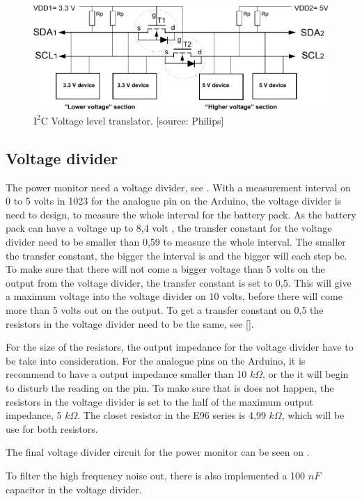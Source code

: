 \begin{figure}[H]
	\centering
	\includegraphics[scale=0.9]{figures/i2cLevel.pdf}
	\caption{$\text{I}^2\text{C}$ Voltage level translator. [source: Philips]}
	\label{i2clevel}
\end{figure}

\subsection{Voltage divider}

The power monitor need a voltage divider, see . With a measurement interval on 0 to 5 volts in 1023 for the analogue pin on the Arduino, the voltage divider is need to design, to measure the whole interval for the battery pack. As the battery pack can have a voltage up to 8,4 volt , the transfer constant for the voltage divider need to be smaller than 0,59 to measure the whole interval. The smaller the transfer constant, the bigger the interval is and the bigger will each step be. To make sure that there will not come a bigger voltage than 5 volts on the output from the voltage divider, the transfer constant is set to 0,5. This will give a maximum voltage into the voltage divider on 10 volts, before there will come more than 5 volts out on the output. To get a transfer constant on 0,5 the resistors in the voltage divider need to be the same, see \eqref{}.


For the size of the resistors, the output impedance for the voltage divider have to be take into consideration. For the analogue pins on the Arduino, it is recommend to have a output impedance smaller than 10 $k\Omega$, or the it will begin to disturb the reading on the pin.
To make sure that is does not happen, the resistors in the voltage divider is set to the half of the maximum output impedance, 5 $k\Omega$. The closet resistor in the E96 series is 4,99 $k\Omega$, which will be use for both resistors. 

The final voltage divider circuit for the power monitor can be seen on \figref{}.


To filter the high frequency noise out, there is also implemented a 100 $nF$ capacitor in the voltage divider.


